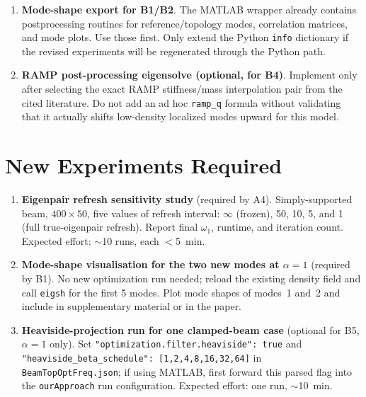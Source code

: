 \documentclass[12pt,a4paper]{article}
\begin{document}
\begin{enumerate}[leftmargin=1.6em]
  \item \textbf{Mode-shape export for B1/B2}.
        The MATLAB wrapper already contains postprocessing routines for
        reference/topology modes, correlation matrices, and mode plots.  Use
        those first.  Only extend the Python \texttt{info} dictionary if the
        revised experiments will be regenerated through the Python path.

  \item \textbf{RAMP post-processing eigensolve (optional, for B4)}.
        Implement only after selecting the exact RAMP stiffness/mass
        interpolation pair from the cited literature.  Do not add an ad hoc
        \texttt{ramp\_q} formula without validating that it actually shifts
        low-density localized modes upward for this model.

\end{enumerate}

\section{New Experiments Required}

\begin{enumerate}[leftmargin=1.6em]

  \item \textbf{Eigenpair refresh sensitivity study} (required by A4).
        Simply-supported beam, $400{\times}50$, five values of
        refresh interval: $\infty$ (frozen), 50, 10, 5, and 1 (full
        true-eigenpair refresh).  Report final
        $\omega_1$, runtime, and iteration count.  Expected effort:
        $\sim$10 runs, each $<$5~min.

  \item \textbf{Mode-shape visualisation for the two new modes at
        $\alpha=1$} (required by B1).  No new optimization run needed;
        reload the existing density field and call \texttt{eigsh} for
        the first 5 modes. Plot mode shapes of modes~1 and~2 and
        include in supplementary material or in the paper.

  \item \textbf{Heaviside-projection run for one clamped-beam case}
        (optional for B5, $\alpha=1$ only).  Set
        \texttt{"optimization.filter.heaviside": true} and
        \texttt{"heaviside\_beta\_schedule": [1,2,4,8,16,32,64]}
        in \texttt{BeamTopOptFreq.json}; if using MATLAB, first forward this
        parsed flag into the \texttt{ourApproach} run configuration.
        Expected effort: one run, $\sim$10~min.

\end{enumerate}
\end{document}
